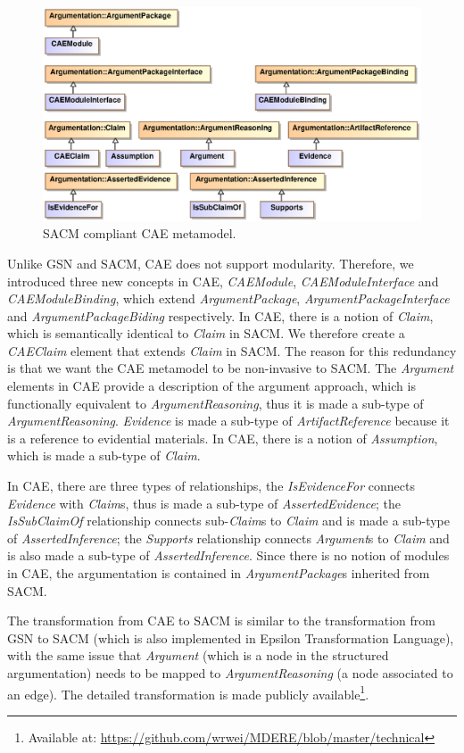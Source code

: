 \begin{figure}
	\centering
	\includegraphics[width=1\linewidth]{CAE.eps}
	\caption{SACM compliant CAE metamodel.}
	\label{fig:caeMetamodel}
\end{figure}

Unlike GSN and SACM, CAE does not support modularity.
Therefore, we introduced three new concepts in CAE, \textit{CAEModule}, \textit{CAEModuleInterface} and \textit{CAEModuleBinding}, which extend \textit{ArgumentPackage}, \textit{ArgumentPackageInterface} and \textit{ArgumentPackageBiding} respectively.
In CAE, there is a notion of \textit{Claim}, which is semantically identical to \textit{Claim} in SACM. 
We therefore create a \textit{CAEClaim} element that extends \textit{Claim} in SACM. 
The reason for this redundancy is that we want the CAE metamodel to be non-invasive to SACM. 
The \textit{Argument} elements in CAE provide a description of the argument approach, which is functionally equivalent to \textit{ArgumentReasoning}, thus it is made a sub-type of \textit{ArgumentReasoning}.
\textit{Evidence} is made a sub-type of \textit{ArtifactReference} because it is a reference to evidential materials. 
In CAE, there is a notion of \textit{Assumption}, which is made a sub-type of \textit{Claim}. 

In CAE, there are three types of relationships, the \textit{IsEvidenceFor} connects \textit{Evidence} with \textit{Claim}s, thus is made a sub-type of \textit{AssertedEvidence}; the \textit{IsSubClaimOf} relationship connects sub-\textit{Claim}s to \textit{Claim} and is made a sub-type of \textit{AssertedInference}; the \textit{Supports} relationship connects \textit{Argument}s to \textit{Claim} and is also made a sub-type of \textit{AssertedInference}. 
Since there is no notion of modules in CAE, the argumentation is contained in \textit{ArgumentPackage}s inherited from SACM.

The transformation from CAE to SACM is similar to the transformation from GSN to SACM (which is also implemented in Epsilon Transformation Language), with the same issue that \textit{Argument} (which is a node in the structured argumentation) needs to be mapped to \textit{ArgumentReasoning} (a node associated to an edge).
The detailed transformation is made publicly available\footnote{Available at: \url{https://github.com/wrwei/MDERE/blob/master/technical}}.




